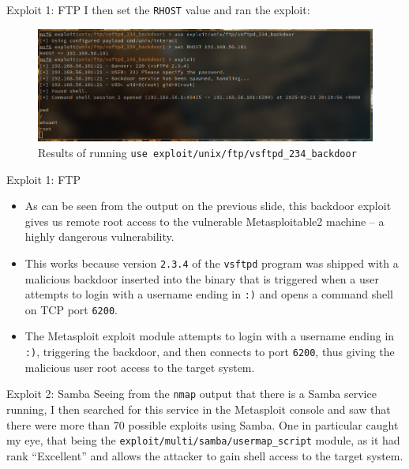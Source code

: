 \documentclass[]{beamer}
\begin{document}
\begin{frame}{Exploit 1: FTP}
    I then set the \texttt{RHOST} value and ran the exploit:

\begin{figure}[H]
    \centering
    \includegraphics[width=\textwidth]{./images/ftpexploit.png}
    \caption{Results of running \texttt{use exploit/unix/ftp/vsftpd\_234\_backdoor}}
\end{figure}
\end{frame}

\begin{frame}{Exploit 1: FTP}
    \begin{itemize}
        \item   As can be seen from the output on the previous slide, this backdoor exploit gives us remote root access to the vulnerable Metasploitable2 machine -- a highly dangerous vulnerability.
        \item   This works because version \texttt{2.3.4} of the \texttt{vsftpd} program was shipped with a malicious backdoor inserted into the binary that is triggered when a user attempts to login with a username ending in \texttt{:)} and opens a command shell on TCP port \texttt{6200}.
        \item   The Metasploit exploit module attempts to login with a username ending in \texttt{:)}, triggering the backdoor, and then connects to port \texttt{6200}, thus giving the malicious user root access to the target system.
    \end{itemize}
\end{frame}

\begin{frame}{Exploit 2: Samba}
    Seeing from the \texttt{nmap} output that there is a Samba service running, I then searched for this service in the Metasploit console and saw that there were more than 70 possible exploits using Samba.
    One in particular caught my eye, that being the \texttt{exploit/multi/samba/usermap\_script} module, as it had rank ``Excellent'' and allows the attacker to gain shell access to the target system.
\end{frame}
\end{document}
